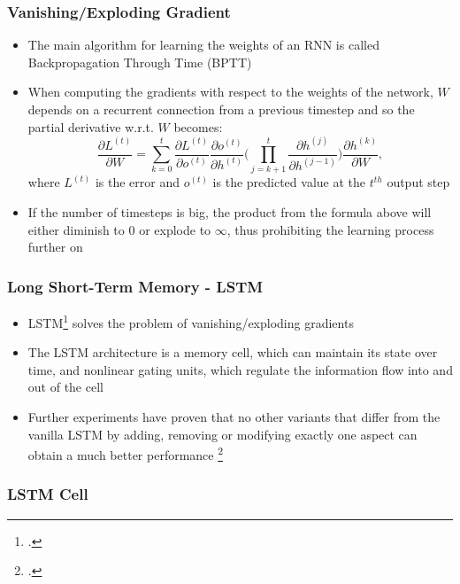 \documentclass{beamer}
\begin{document}
\begin{frame}
\frametitle{Vanishing/Exploding Gradient}
\begin{itemize}
	\item The main algorithm for learning the weights of an RNN is called Backpropagation Through Time (BPTT)
	\item When computing the gradients with respect to the weights of the network, \(W\) depends on a recurrent connection from a previous timestep and so the partial derivative w.r.t. \(W\) becomes:
	\[
		\frac{\partial L^{(t)}}{\partial W} = \sum_{k=0}^{t} \frac{\partial L^{(t)}}{\partial o^{(t)}} \frac{\partial o^{(t)}}{\partial h^{(t)}} \bigg( \prod_{j=k+1}^t \frac{\partial h^{(j)}}{\partial h^{(j-1)}} \bigg) \frac{\partial h^{(k)}}{\partial W},
	\]
	where \(L^{(t)}\) is the error and \(o^{(t)}\) is the predicted value at the \(t^{th}\) output step
	\item If the number of timesteps is big, the product from the formula above will either diminish to \(0\) or explode to \(\infty\), thus prohibiting the learning process further on
\end{itemize}
\end{frame}

\begin{frame}
\frametitle{Long Short-Term Memory - LSTM}
\begin{itemize}
	\item LSTM\footcite{lstm} solves the problem of vanishing/exploding gradients
	\item The LSTM architecture is a memory cell, which can maintain its state over time, and nonlinear gating units, which regulate the information flow into and out of the cell
	\item Further experiments have proven that no other variants that differ from the vanilla LSTM by adding, removing or modifying exactly one aspect can obtain a much better performance \footcite{DBLP:journals/corr/GreffSKSS15}
\end{itemize}
\end{frame}

\begin{frame}
\frametitle{LSTM Cell}
\begin{figure}
	\subcapcentertrue
    \centering
    \end{figure}
\end{frame}
\end{document}
